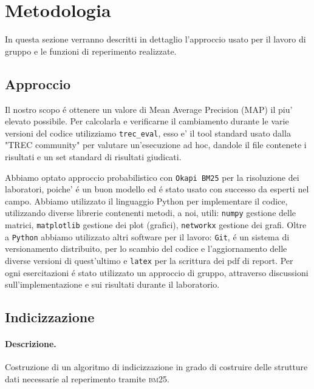 \section{Metodologia}
\label{sec:metodologia}

In questa sezione verranno descritti in dettaglio l'approccio usato per il lavoro di gruppo e le funzioni di reperimento realizzate.


\subsection{Approccio}
\label{sec:approccio}

Il nostro scopo \'e ottenere un valore di Mean Average Precision (\textsc{MAP}) il piu' elevato possibile. Per calcolarla e verificarne il cambiamento durante le varie versioni del codice utilizziamo \texttt{trec\_eval}, esso e' il tool standard usato dalla "TREC community" per valutare un'esecuzione ad hoc, dandole il file contenete i risultati e un set standard di risultati giudicati.  

Abbiamo optato approccio probabilistico con \texttt{Okapi BM25} per la risoluzione dei laboratori, poiche' \'e un buon modello ed \'e stato usato con successo da esperti nel campo.  
Abbiamo utilizzato il linguaggio Python per implementare il codice, utilizzando diverse librerie contenenti metodi, a noi, utili: \texttt{numpy} gestione delle matrici, \texttt{matplotlib} gestione dei plot (grafici), \texttt{networkx} gestione dei grafi.
Oltre a \texttt{Python} abbiamo utilizzato altri software per il lavoro: \texttt{Git}, \'e un sistema di versionamento distribuito, per lo scambio del codice e l'aggiornamento delle diverse versioni di quest'ultimo e \texttt{latex} per la scrittura dei pdf di report.
Per ogni esercitazioni \'e stato utilizzato un approccio di gruppo, attraverso discussioni sull'implementazione e sui risultati durante il laboratorio.

\subsection{Indicizzazione} \label{sec:metodi-di-indic}

\paragraph{\textbf{Descrizione.}} Costruzione di un algoritmo di indicizzazione in grado di costruire delle strutture dati necessarie al reperimento tramite \textsc{bm25}. 

